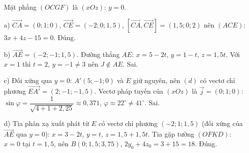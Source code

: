 \begin{ex}
{Mặt phẳng $(OCGF)$ là $(xOz)$: $y=0$.

a) $\overrightarrow{CA}=(0;1;0)$, $\overrightarrow{CE}=(-2;0;1{,}5)$, $[\overrightarrow{CA},\overrightarrow{CE}]=(1{,}5;0;2)$ nên $(ACE)$: $3x+4z-15=0$. Đúng.

b) $\overrightarrow{AE}=(-2;-1;1{,}5)$. Đường thẳng $AE$: $x=5-2t$, $y=1-t$, $z=1{,}5t$. Với $x=1$ thì $t=2$, $y=-1\ne3$ nên $J\notin AE$. Sai.

c) Đối xứng qua $y=0$: $A'(5;-1;0)$ và $E$ giữ nguyên, nên $(d)$ có vectơ chỉ phương $\overrightarrow{EA'}=(2;-1;-1{,}5)$. Vectơ pháp tuyến của $(xOz)$ là $\vec j=(0;1;0)$: $\sin\varphi=\dfrac{1}{\sqrt{4+1+2{,}25}}\approx0{,}371$, $\varphi\approx22^\circ\ne41^\circ$. Sai.

d) Tia phản xạ xuất phát từ $E$ có vectơ chỉ phương $(-2;1;1{,}5)$ (đối xứng của $\overrightarrow{AE}$ qua $y=0$): $x=3-2t$, $y=t$, $z=1{,}5+1{,}5t$. Tia gặp tường $(OFKD)$: $x=0$ tại $t=1{,}5$, nên $B(0;1{,}5;3{,}75)$, $2y_0+4z_0=3+15=18$. Đúng.}
\end{ex}
